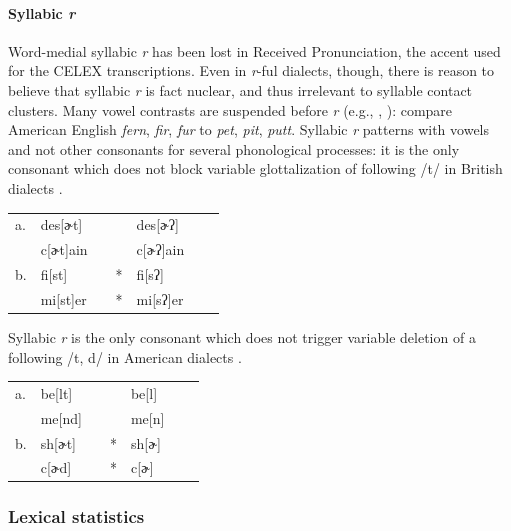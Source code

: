 \paragraph{Syllabic \emph{r}} Word-medial syllabic \emph{r} has been lost in Received Pronunciation, the accent used for the CELEX transcriptions. Even in \emph{r}-ful dialects, though, there is reason to believe that syllabic \emph{r} is fact nuclear, and thus irrelevant to syllable contact clusters. Many vowel contrasts are suspended before \emph{r} (e.g., \citealt[269f.]{Fudge1969}, \citealt[][255]{Harris1994}): compare American English \emph{fern}, \emph{fir}, \emph{fur} to \emph{pet}, \emph{pit}, \emph{putt}. Syllabic \emph{r} patterns with vowels and not other consonants for several phonological processes: it is the only consonant which does not block variable glottalization of following /t/ in British dialects \citep[258]{Harris1994}. 

\begin{example}
\begin{tabular}{l l l l@{} l l l}
a. & {des}[ɚt]    & \alt{} &   & {des}[ɚʔ]    \\
   & {c}[ɚt]{ain} & \alt{} &   & {c}[ɚʔ]{ain} \\
b. & {fi}[st]     & \alt{} & * & {fi}[sʔ]     \\
   & {mi}[st]{er} & \alt{} & * & {mi}[sʔ]{er} \\
\end{tabular}
\end{example}

\noindent Syllabic \emph{r} is the only consonant which does not trigger variable deletion of a following /t, d/ in American dialects \citep[8]{Guy1980}.

\begin{example}
\begin{tabular}{l l l l@{} l l l}
a. & {be}[lt] & \alt{} &   & {be}[l] \\
   & {me}[nd] & \alt{} &   & {me}[n] \\
b. & {sh}[ɚt] & \alt{} & * & {sh}[ɚ] \\
   & {c}[ɚd]  & \alt{} & * & {c}[ɚ]  \\
\end{tabular}
\end{example}

\subsubsection{Lexical statistics}

